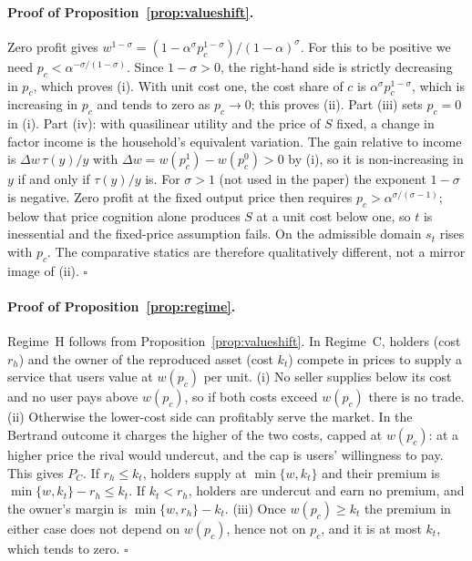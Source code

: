 \documentclass[12pt]{article}
\theoremstyle{remark}
\begin{document}
\paragraph{Proof of Proposition~\ref{prop:valueshift}.} Zero profit gives $w^{1-\sigma}=(1-\alpha^\sigma p_c^{1-\sigma})/(1-\alpha)^\sigma$. For this to be positive we need $p_c<\alpha^{-\sigma/(1-\sigma)}$. Since $1-\sigma>0$, the right-hand side is strictly decreasing in $p_c$, which proves (i). With unit cost one, the cost share of $c$ is $\alpha^\sigma p_c^{1-\sigma}$, which is increasing in $p_c$ and tends to zero as $p_c\to0$; this proves (ii). Part (iii) sets $p_c=0$ in (i). Part (iv): with quasilinear utility and the price of $S$ fixed, a change in factor income is the household's equivalent variation. The gain relative to income is $\Delta w\,\tau(y)/y$ with $\Delta w=w(p_c^1)-w(p_c^0)>0$ by (i), so it is non-increasing in $y$ if and only if $\tau(y)/y$ is. For $\sigma>1$ (not used in the paper) the exponent $1-\sigma$ is negative. Zero profit at the fixed output price then requires $p_c>\alpha^{\sigma/(\sigma-1)}$; below that price cognition alone produces $S$ at a unit cost below one, so $t$ is inessential and the fixed-price assumption fails. On the admissible domain $s_t$ rises with $p_c$. The comparative statics are therefore qualitatively different, not a mirror image of (ii). $\square$

\paragraph{Proof of Proposition~\ref{prop:regime}.} Regime~H follows from Proposition~\ref{prop:valueshift}. In Regime~C, holders (cost $r_h$) and the owner of the reproduced asset (cost $k_t$) compete in prices to supply a service that users value at $w(p_c)$ per unit. (i) No seller supplies below its cost and no user pays above $w(p_c)$, so if both costs exceed $w(p_c)$ there is no trade. (ii) Otherwise the lower-cost side can profitably serve the market. In the Bertrand outcome it charges the higher of the two costs, capped at $w(p_c)$: at a higher price the rival would undercut, and the cap is users' willingness to pay. This gives $P_C$. If $r_h\le k_t$, holders supply at $\min\{w,k_t\}$ and their premium is $\min\{w,k_t\}-r_h\le k_t$. If $k_t<r_h$, holders are undercut and earn no premium, and the owner's margin is $\min\{w,r_h\}-k_t$. (iii) Once $w(p_c)\ge k_t$ the premium in either case does not depend on $w(p_c)$, hence not on $p_c$, and it is at most $k_t$, which tends to zero. $\square$
\end{document}
